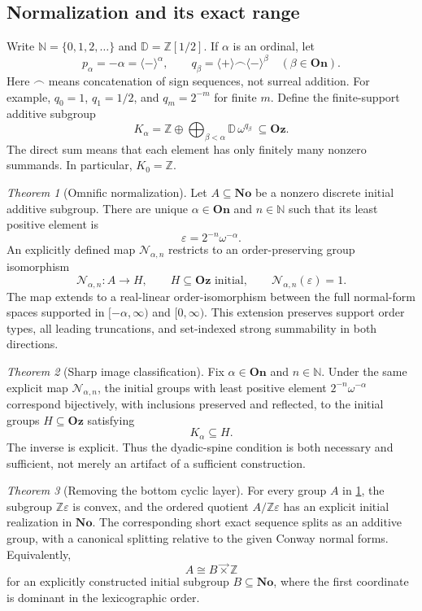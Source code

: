 \documentclass[11pt]{article}
\theoremstyle{definition}
\theoremstyle{remark}
\newtheorem{maintheorem}{Theorem}
\newcommand{\No}{\ensuremath{\mathbf{No}}}
\newcommand{\Oz}{\ensuremath{\mathbf{Oz}}}
\newcommand{\On}{\ensuremath{\mathbf{On}}}
\newcommand{\Z}{\mathbb{Z}}
\newcommand{\N}{\mathbb{N}}
\newcommand{\D}{\mathbb{D}}
\newcommand{\cat}{\mathbin{\frown}}
\newcommand{\plus}{\langle+\rangle}
\newcommand{\minus}{\langle-\rangle}
\newcommand{\Rect}{\mathcal{N}_{\alpha,n}}
\newcommand{\lex}{\mathbin{\overrightarrow{\times}}}
\begin{document}
\subsection{Normalization and its exact range}
Write $\N=\{0,1,2,\ldots\}$ and $\D=\Z[1/2]$. If $\alpha$ is an ordinal, let
\[
 p_\alpha=-\alpha=\minus^{\alpha},
 \qquad q_\beta=\plus\cat\minus^{\beta}\quad(\beta\in\On).
\]
Here $\cat$ means concatenation of sign sequences, not surreal addition.
For example, $q_0=1$, $q_1=1/2$, and $q_m=2^{-m}$ for finite $m$.
Define the finite-support additive subgroup
\begin{equation}\label{isg:eq:Kintro}
 K_\alpha=\Z\oplus\bigoplus_{\beta<\alpha}\D\,\omega^{q_\beta}
 \ \subseteq\Oz.
\end{equation}
The direct sum means that each element has only finitely many nonzero
summands. In particular, $K_0=\Z$.

\begin{maintheorem}[Omnific normalization]\label{isg:thm:A}
Let $A\subseteq\No$ be a nonzero discrete initial additive subgroup.
There are unique $\alpha\in\On$ and $n\in\N$ such that its least positive
element is
\[
 \varepsilon=2^{-n}\omega^{-\alpha}.
\]
An explicitly defined map $\Rect$ restricts to an order-preserving group
isomorphism
\[
 \Rect:A\longrightarrow H,
 \qquad H\subseteq\Oz\text{ initial},\qquad \Rect(\varepsilon)=1.
\]
The map extends to a real-linear order-isomorphism between the full
normal-form spaces supported in $[-\alpha,\infty)$ and $[0,\infty)$.
This extension preserves support order types, all leading truncations,
and set-indexed strong summability in both directions.
\end{maintheorem}

\begin{maintheorem}[Sharp image classification]\label{isg:thm:B}
Fix $\alpha\in\On$ and $n\in\N$. Under the same explicit map $\Rect$,
the initial groups with least positive element
$2^{-n}\omega^{-\alpha}$ correspond bijectively, with inclusions
preserved and reflected, to the initial groups $H\subseteq\Oz$ satisfying
\[
 K_\alpha\subseteq H.
\]
The inverse is explicit. Thus the dyadic-spine condition is both necessary
and sufficient, not merely an artifact of a sufficient construction.
\end{maintheorem}

\begin{maintheorem}[Removing the bottom cyclic layer]\label{isg:thm:C}
For every group $A$ in \cref{isg:thm:A}, the subgroup $\Z\varepsilon$ is
convex, and the ordered quotient $A/\Z\varepsilon$ has an explicit
initial realization in $\No$. The corresponding short exact sequence
splits as an additive group, with a canonical splitting relative to the
given Conway normal forms. Equivalently,
\[
 A\cong B\lex\Z
\]
for an explicitly constructed initial subgroup $B\subseteq\No$, where
the first coordinate is dominant in the lexicographic order.
\end{maintheorem}
\end{document}
